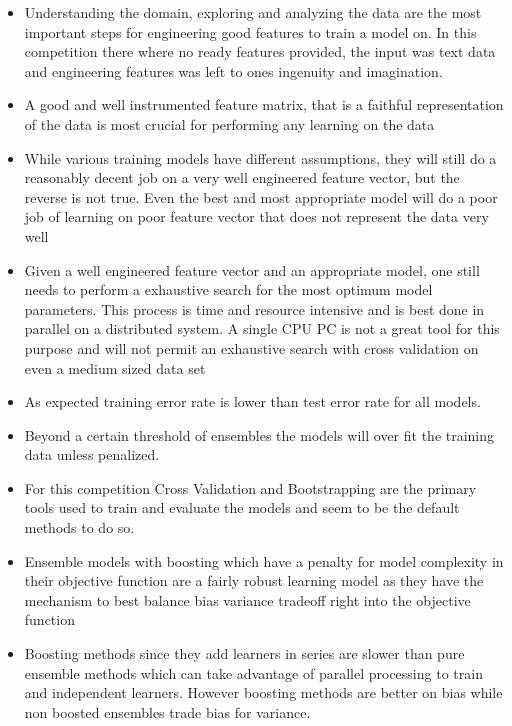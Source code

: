 \documentclass[twoside,12pt]{article}
\begin{document}
\FloatBarrier
\begin{itemize}
\item
Understanding the domain, exploring and analyzing the data are the most important steps for engineering good features to train a model on. In this competition there where no ready features provided, the input was text data and engineering features was left to ones ingenuity and imagination.
\item
A good and well instrumented feature matrix, that is a faithful representation of the data is most crucial for performing any learning on the data
\item
While various training models have different assumptions, they will still do a reasonably decent job on a  very well engineered feature vector, but the reverse is not true. Even the best and most appropriate model will do a poor job of learning on poor feature vector that does not represent the data very well
\item
Given a well engineered feature vector and an appropriate model, one still needs to perform a exhaustive search for the most optimum model parameters. This process is time and resource intensive and is best done in parallel on a distributed system. A single CPU PC is not a great tool for this purpose and will not permit an exhaustive search with cross validation on even a medium sized data set
\item
As expected training error rate is lower than test error rate for all models. 
\item
Beyond a certain threshold of ensembles the models will over fit the training data unless penalized.
\item
For this competition Cross Validation and Bootstrapping are the primary tools used to train and evaluate the models and seem to be the default methods to do so.
\item
Ensemble models with boosting which have a penalty for model complexity in their objective function are a fairly robust learning model as they have the mechanism to best balance bias variance tradeoff right into the objective function
\item
Boosting methods since they add learners in series are slower than pure ensemble methods which can take advantage of parallel processing to train and independent learners. However boosting methods are better on bias while non boosted ensembles trade bias for variance.
\end{itemize}

\FloatBarrier
\end{document}
